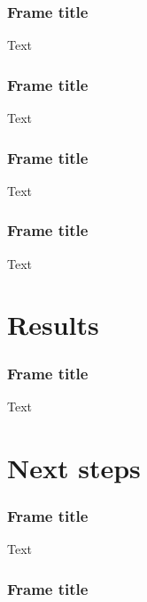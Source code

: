 \documentclass{beamer}
\begin{document}
\begin{frame}
\frametitle{Frame title}
Text
\end{frame}


\begin{frame}
\frametitle{Frame title}
Text
\end{frame}


\begin{frame}
\frametitle{Frame title}
Text
\end{frame}


\begin{frame}
\frametitle{Frame title}
Text
\end{frame}

\section{Results}

\begin{frame}
\frametitle{Frame title}
Text
\end{frame}

\section{Next steps}

\begin{frame}
\frametitle{Frame title}
Text
\end{frame}

\begin{frame}
\frametitle{Frame title}

\printbibliography

\end{frame}
\end{document}

